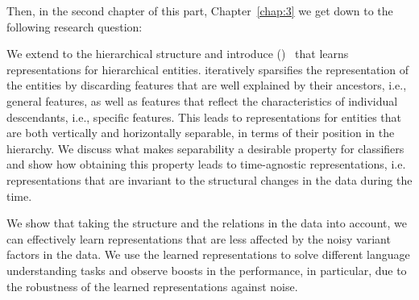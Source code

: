Then, in the second chapter of this part, Chapter~\ref{chap:3} we get down to the following research question:

We extend \emph{\swlms} to the hierarchical structure and introduce \emph{\hswlms} (\achswlm)~\citep{Dehghani:2016:ICTIR, Dehghani:2016:CLEF} that learns representations for hierarchical entities. \achswlm iteratively sparsifies the representation of the entities by discarding features that are well explained by their ancestors, i.e., general features, as well as features that reflect the characteristics of individual descendants, i.e., specific features. This leads to representations for entities that are both vertically and horizontally separable, in terms of their position in the hierarchy. We discuss what makes separability a desirable property for classifiers and show how obtaining this property leads to time-agnostic representations, i.e. representations that are invariant to the structural changes in the data during the time.

\medskip
We show that taking the structure and the relations in the data into account, we can effectively learn representations that are less affected by the noisy variant factors in the data. We use the learned representations to solve different language understanding tasks and observe boosts in the performance, in particular, due to the robustness of the learned representations against noise.


